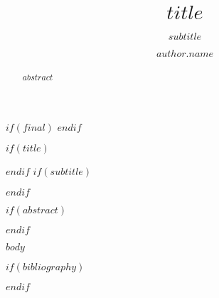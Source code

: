 \documentclass[manuscript,screen,review,anonymous]{acmart}
\author{$author.name$}
\affiliation{
		$if(author.institution)$
			\institution{$author.institution$}
		$endif$
		$if(author.department)$
			\institution{$author.department$}
		$endif$
		$if(author.city)$
			\city{$author.city$}
		$endif$
		$if(author.country)$
			\country{$author.country$}
		$endif$
	}
\begin{document}
$if(final)$
	\fancyhead{}
$endif$

$if(title)$
	\title{$title$}
$endif$
$if(subtitle)$
	\subtitle{$subtitle$}
$endif$


$if(abstract)$
\begin{abstract}
$abstract$
\end{abstract}
$endif$


\renewcommand{\shortauthors}{$shortauthors$}


\maketitle


$body$


$if(bibliography)$
	\balance
	
$endif$
\end{document}
